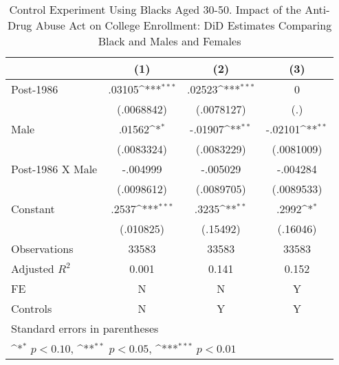 \begin{table}[htbp]\centering
\def\sym#1{\ifmmode^{#1}\else\(^{#1}\)\fi}
\caption{Control Experiment Using Blacks Aged 30-50. Impact of the Anti-Drug Abuse Act on College Enrollment: DiD Estimates Comparing Black and Males and Females}
\begin{tabular}{l*{3}{c}}
\hline\hline
                    &\multicolumn{1}{c}{(1)}         &\multicolumn{1}{c}{(2)}         &\multicolumn{1}{c}{(3)}         \\
\hline
Post-1986           &      .03105\sym{***}&      .02523\sym{***}&           0         \\
                    &  (.0068842)         &  (.0078127)         &         (.)         \\
[1em]
Male                &      .01562\sym{*}  &     -.01907\sym{**} &     -.02101\sym{**} \\
                    &  (.0083324)         &  (.0083229)         &  (.0081009)         \\
[1em]
Post-1986 X Male    &    -.004999         &    -.005029         &    -.004284         \\
                    &  (.0098612)         &  (.0089705)         &  (.0089533)         \\
[1em]
Constant            &       .2537\sym{***}&       .3235\sym{**} &       .2992\sym{*}  \\
                    &   (.010825)         &    (.15492)         &    (.16046)         \\
\hline
Observations        &       33583         &       33583         &       33583         \\
Adjusted \(R^{2}\)  &       0.001         &       0.141         &       0.152         \\
FE                  &           N         &           N         &           Y         \\
Controls            &           N         &           Y         &           Y         \\
\hline\hline
\multicolumn{4}{l}{\footnotesize Standard errors in parentheses}\\
\multicolumn{4}{l}{\footnotesize \sym{*} \(p<0.10\), \sym{**} \(p<0.05\), \sym{***} \(p<0.01\)}\\
\end{tabular}
\end{table}
